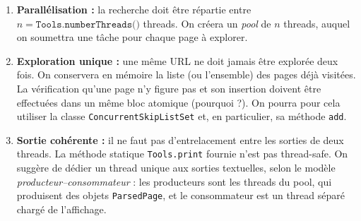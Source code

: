 \documentclass{td}
\begin{document}
\begin{enumerate}
  \item \textbf{Parallélisation :}
  la recherche doit être répartie entre $n = \texttt{Tools.numberThreads()}$ threads.
  On créera un \emph{pool} de $n$ threads, auquel on soumettra une tâche pour chaque page à explorer.

  \item \textbf{Exploration unique :}
  une même URL ne doit jamais être explorée deux fois.
  On conservera en mémoire la liste (ou l'ensemble) des pages déjà visitées.
  La vérification qu'une page n'y figure pas et son insertion doivent être effectuées dans un même bloc atomique
  (pourquoi ?).  
  On pourra pour cela utiliser la classe \texttt{ConcurrentSkipListSet} et, en particulier, sa méthode \texttt{add}.

  \item \textbf{Sortie cohérente :}
  il ne faut pas d'entrelacement entre les sorties de deux threads.
  La méthode statique \texttt{Tools.print} fournie n'est pas thread-safe.
  On suggère de dédier un thread unique aux sorties textuelles, selon le modèle \emph{producteur–consommateur} :
  les producteurs sont les threads du pool, qui produisent des objets \texttt{ParsedPage},
  et le consommateur est un thread séparé chargé de l'affichage.
\end{enumerate}
\end{document}
